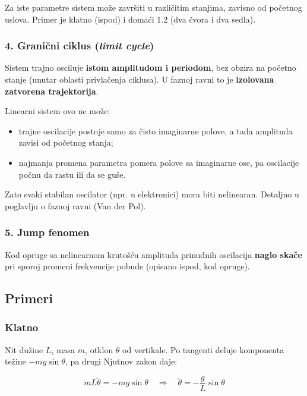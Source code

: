 \documentclass[11pt,a4paper,parskip=half,headsepline,numbers=noenddot]{scrartcl}
\begin{document}
Za iste parametre sistem može završiti u različitim stanjima, zavisno od početnog uslova. Primer je klatno (ispod) i domaći 1.2 (dva čvora i dva sedla).

\subsubsection{\texorpdfstring{4. Granični ciklus (\emph{limit cycle})}{4. Granični ciklus (limit cycle)}}

Sistem trajno osciluje \textbf{istom amplitudom i periodom}, bez obzira na početno stanje (unutar oblasti privlačenja ciklusa). U faznoj ravni to je \textbf{izolovana zatvorena trajektorija}.

Linearni sistem ovo ne može:

\begin{itemize}
\item trajne oscilacije postoje samo za čisto imaginarne polove, a tada amplituda zavisi od početnog stanja;
\item najmanja promena parametra pomera polove sa imaginarne ose, pa oscilacije počnu da rastu ili da se guše.
\end{itemize}

Zato svaki stabilan oscilator (npr. u elektronici) mora biti nelinearan. Detaljno u poglavlju o faznoj ravni (Van der Pol).

\subsubsection{5. Jump fenomen}

Kod opruge sa nelinearnom krutošću amplituda prinudnih oscilacija \textbf{naglo skače} pri sporoj promeni frekvencije pobude (opisano ispod, kod opruge).

\subsection{Primeri}

\subsubsection{Klatno}

Nit dužine \(L\), masa \(m\), otklon \(\theta\) od vertikale. Po tangenti deluje komponenta težine \(-mg\sin\theta\), pa drugi Njutnov zakon daje:

\[mL\ddot\theta = -mg\sin\theta \quad\Rightarrow\quad \ddot\theta = -\frac{g}{L}\sin\theta\]
\end{document}
